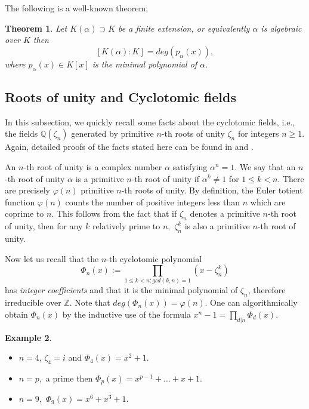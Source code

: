 \documentclass[a4paper,onecolumn,accepted=2026-04-08,10pt]{quantumarticle}
\newtheorem{theorem}{Theorem}[section]
\theoremstyle{definition}
\newtheorem{example}[theorem]{Example}
\begin{document}
The following is a well-known theorem, 
\begin{theorem} Let $K(\alpha)\supset K$ be a finite extension, or equivalently $\alpha$ is algebraic over $K$ then 
    $$[K(\alpha):K] = deg(p_{\alpha}(x)),$$
   where $p_{\alpha}(x) \in K[x]$ is the minimal polynomial of $\alpha.$ 
\end{theorem}


\subsection{Roots of unity and Cyclotomic fields}

In this subsection, we quickly recall some facts about the cyclotomic fields, i.e., the fields $\mathbb{Q}(\zeta_n)$ generated by primitive $n$-th roots of unity $\zeta_n$ for integers $n \geq 1.$ Again, detailed proofs of the facts stated here can be found in \cite{dummit_foote_abstract_2003} and \cite{lang_2002_algebra}.

 An $n$-th root of unity is a complex number $\alpha$ satisfying $\alpha^n = 1.$ We say that an $n$-th root of unity $\alpha$ is a primitive $n$-th root of unity if $\alpha^k \neq 1$ for $1 \leq k < n.$ There are precisely $\varphi(n)$ primitive $n$-th roots of unity. By definition, the Euler totient function $\varphi(n)$ counts the number of positive integers less than $n$ which are coprime to $n$. This follows from the fact that if $\zeta_n$ denotes a primitive $n$-th root of unity, then for any $k$ relatively prime to $n,$ $\zeta_n^{k}$ is also a primitive $n$-th root of unity. 

 Now let us recall that the $n$-th cyclotomic polynomial $$\varPhi_n(x) := \prod_{1 \leq k < n : gcd(k,n)=1} (x - \zeta_{n}^{k})$$
has \textit{integer coefficients} and that it is the minimal polynomial of $\zeta_n$, therefore irreducible over $\mathbb{Z}$. Note that $deg(\varPhi_n(x)) = \varphi(n)$. One can algorithmically obtain $\varPhi_n(x)$ by the inductive use of the formula $x^n - 1 = \prod_{d |n} \varPhi_d(x).$ 

 \begin{example}
     \begin{itemize}
         \item[1.] $n=4$, $\zeta_4 = i$ and $\varPhi_{4}(x) = x^2 +1.$
         \item [2.] $n=p,$ a prime then $\varPhi_{p}(x) = x^{p-1} + \ldots + x + 1.$
         \item[3.] $n=9,$ $\varPhi_9(x) = x^6 + x^3 + 1.$ 
     \end{itemize}
 \end{example}
\end{document}
